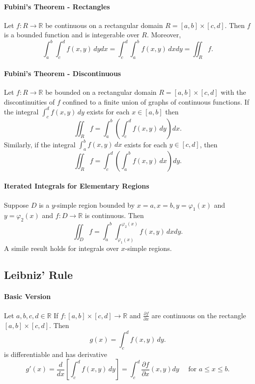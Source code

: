 \paragraph{Fubini's Theorem - Rectangles}
Let \(f: R \to \mathbb R\) be continuous on a rectangular domain \(R = [a, b] \times [c,d].\) Then \(f\) is a bounded function and is integerable over \(R\). Moreover,
\[\int_a^b\int_c^d f(x,y) \, dydx = \int_c^d\int_a^b f(x,y) \, dxdy = \iint_R f.\]

\paragraph{Fubini's Theorem - Discontinuous}
Let \(f: R \to \mathbb R\) be bounded on a rectangular domain \(R= [a,b] \times [c,d]\) with the discontinuities of \(f\) confined to a finite union of graphs of continuous functions. If the integral \(\int_c^d f(x,y) \, dy\) exists for each \(x\in[a,b]\) then
\[\iint_R f = \int_a^b \left(\int_c^d f(x,y) \, dy\right) dx.\]
Similarly, if the integral \(\int_a^b f(x,y) \, dx\) exists for each \(y\in[c,d]\), then
\[\iint_R f = \int_c^d \left(\int_a^b f(x,y) \, dx\right) dy.\]

\paragraph{Iterated Integrals for Elementary Regions}
Suppose \(D\) is a \(y\)-simple region bounded by \(x=a, x=b, y= \varphi_1(x)\) and \(y=\varphi_2(x)\) and \(f:D\to \mathbb R\) is continuous. Then
\[\iint_D f = \int_a^b \int_{\varphi_1(x)}^{\varphi_2(x)} f(x,y) \, dx dy.\]
A simile result holds for integrals over \(x\)-simple regions.

\subsection{Leibniz' Rule}
\paragraph{Basic Version}
Let \(a,b,c,d \in \mathbb R\) If \(f: [a,b] \times [c,d] \to \mathbb R\) and \(\frac{\partial f}{\partial x}\) are continuous on the rectangle \([a,b] \times [c,d]\). Then
\[g(x) = \int_c^d f(x,y) \, dy.\]
is differentiable and has derivative 
\[g'(x) = \frac{d}{dx}\left[\int_c^d f(x,y) \, dy\right] = \int_c^d \frac{\partial f}{\partial x}(x,y) dy \quad \text{ for } a\leq x\leq b.\]

